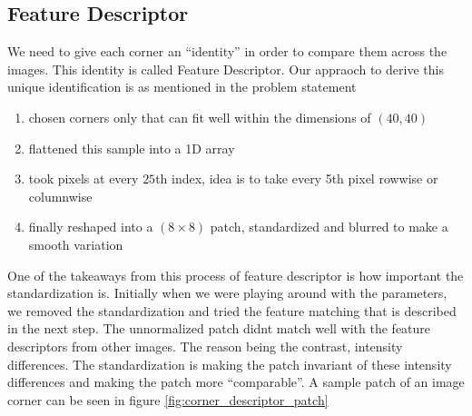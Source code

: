 \documentclass[conference]{IEEEtran}
\begin{document}
\subsection{Feature Descriptor}
We need to give each corner an ``identity'' in order to compare them across the images. This identity is called Feature Descriptor. Our appraoch to derive this unique identification is as mentioned in the problem statement 
\begin{enumerate}
  \item chosen corners only that can fit well within the dimensions of $(40,40)$
  \item flattened this sample into a 1D array
  \item took pixels at every $25$th index, idea is to take every 5th pixel rowwise or columnwise
  \item finally reshaped into a $(8 \times 8)$ patch, standardized and blurred to make a smooth variation
\end{enumerate}

One of the takeaways from this process of feature descriptor is how important the standardization is. Initially when we were playing around with the parameters, we removed the standardization and tried the feature matching that is described in the next step. The unnormalized patch didnt match well with the feature descriptors from other images. The reason being the contrast, intensity differences. The standardization is making the patch invariant of these intensity differences and making the patch more ``comparable''. A sample patch of an image corner can be seen in figure \ref{fig:corner_descriptor_patch}

\end{document}
